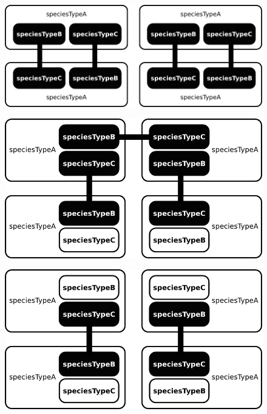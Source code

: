 \begin{figure}[H]
\begin{center}
\includegraphics[scale=0.7]{figs/pngs/ex_nonconnex-saturated.png} 
\caption{}
\label{fig:ex_nonconnex-saturated}
\end{center}
\end{figure}

\begin{figure}[H]
\begin{center}
\includegraphics[scale=0.7]{figs/pngs/ex_connex-nonsaturated.png} 
\caption{}
\label{fig:ex_connex-nonsaturated}
\end{center}
\end{figure}

\begin{figure}[H]
\begin{center}
\includegraphics[scale=0.7]{figs/pngs/ex_nonconnex-nonsaturated.png} 
\caption{}
\label{fig:ex_nonconnex-nonsaturated}
\end{center}
\end{figure}
